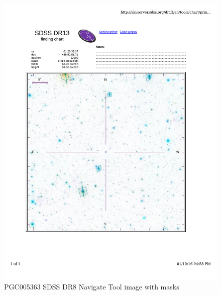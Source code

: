 \documentclass[10pt,letterpaper]{article}
\begin{document}
\begin{figure}[h!]
\centering
\includegraphics[scale=0.7]{figures/PGC005363.pdf}
\caption{PGC005363 SDSS DR8 Navigate Tool image with masks}
\end{figure}
\end{document}

